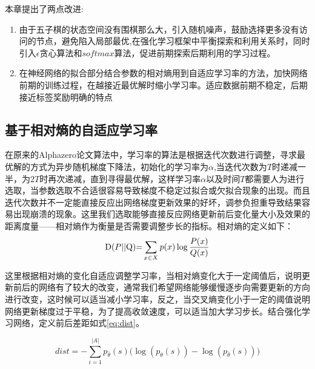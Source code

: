 %


本章提出了两点改进:
\begin{enumerate}
\item 由于五子棋的状态空间没有围棋那么大，引入随机噪声，鼓励选择更多没有访问的节点，避免陷入局部最优,在强化学习框架中平衡探索和利用关系时，同时引入$\epsilon$贪心算法和$softmax$算法，促进前期探索后期利用的学习过程。
\item 在神经网络的拟合部分结合参数的相对熵用到自适应学习率的方法，加快网络前期的训练过程，在越接近最优解时缩小学习率。适应数据前期不稳定，后期接近标签奖励明确的特点
\end{enumerate}



\subsection{基于相对熵的自适应学习率}
在原来的Alphazero论文算法中，学习率的算法是根据迭代次数进行调整，寻求最优解的方式为异步随机梯度下降法，初始化的学习率为$\alpha$,当迭代次数为$T$时递减一半，为$2T$时再次递减，直到寻得最优解，这样学习率$\alpha$以及时间$T$都需要人为进行选取，当参数选取不合适很容易导致梯度不稳定过拟合或欠拟合现象的出现。而且迭代次数并不一定能直接反应出网络梯度更新效果的好坏，调参负担重导致结果容易出现崩溃的现象。这里我们选取能够直接反应网络更新前后变化量大小及效果的距离度量——相对熵作为衡量是否需要调整步长的指标。相对熵的定义如下：
\begin{equation}
{\rm{D}}(P{\rm{||Q}}){\rm{ = }}\sum\limits_{x \in X} {p(x)\log \frac{{P(x)}}{{Q(x)}}} 
\end{equation}

这里根据相对熵的变化自适应调整学习率，当相对熵变化大于一定阈值后，说明更新前后的网络有了较大的改变，通常我们希望网络能够缓慢逐步向需要更新的方向进行改变，这时候可以适当减小学习率，反之，当交叉熵变化小于一定的阈值说明网络更新梯度过于平稳，为了提高收敛速度，可以适当加大学习步长。结合强化学习网络，定义前后差距如式\ref{eq:dist}。

\begin{equation}
\label{eq:dist}
dist =  - \sum\limits_{i = 1}^{|A|} {{p_{\bar \theta }}(s)(\log ({p_\theta }(s)) - \log ({p_{\bar \theta }}(s))} )
\end{equation}

